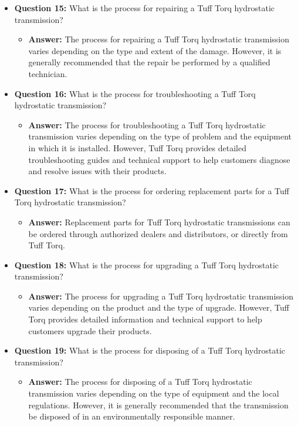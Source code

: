 \documentclass{article}
\begin{document}
\begin{itemize}
    \item \textbf{Question 15:} What is the process for repairing a Tuff Torq hydrostatic transmission?
    \begin{itemize}
        \item \textbf{Answer:} The process for repairing a Tuff Torq hydrostatic transmission varies depending on the type and extent of the damage. However, it is generally recommended that the repair be performed by a qualified technician.
    \end{itemize}
    
    \item \textbf{Question 16:} What is the process for troubleshooting a Tuff Torq hydrostatic transmission?
    \begin{itemize}
        \item \textbf{Answer:} The process for troubleshooting a Tuff Torq hydrostatic transmission varies depending on the type of problem and the equipment in which it is installed. However, Tuff Torq provides detailed troubleshooting guides and technical support to help customers diagnose and resolve issues with their products.
    \end{itemize}
    
    \item \textbf{Question 17:} What is the process for ordering replacement parts for a Tuff Torq hydrostatic transmission?
    \begin{itemize}
        \item \textbf{Answer:} Replacement parts for Tuff Torq hydrostatic transmissions can be ordered through authorized dealers and distributors, or directly from Tuff Torq.
    \end{itemize}
    
    \item \textbf{Question 18:} What is the process for upgrading a Tuff Torq hydrostatic transmission?
    \begin{itemize}
        \item \textbf{Answer:} The process for upgrading a Tuff Torq hydrostatic transmission varies depending on the product and the type of upgrade. However, Tuff Torq provides detailed information and technical support to help customers upgrade their products.
    \end{itemize}
    
    \item \textbf{Question 19:} What is the process for disposing of a Tuff Torq hydrostatic transmission?
    \begin{itemize}
        \item \textbf{Answer:} The process for disposing of a Tuff Torq hydrostatic transmission varies depending on the type of equipment and the local regulations. However, it is generally recommended that the transmission be disposed of in an environmentally responsible manner.
    \end{itemize}
    

\end{itemize}
\end{document}
